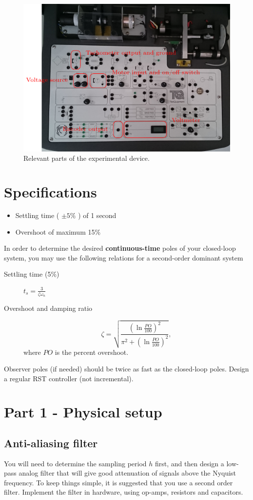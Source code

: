 \documentclass[a4paper]{scrartcl}
\begin{document}
\begin{figure}
\begin{center}
\includegraphics[width=0.7\linewidth]{figures/overview}
\caption{Relevant parts of the experimental device.}
\label{fig:equipment}
\end{center}
\end{figure}

\section*{Specifications}
\label{sec-2}

\begin{itemize}
\item Settling time ( \(\pm 5\%\) ) of 1 second
\item Overshoot of maximum 15\%
\end{itemize}

In order to determine the desired \textbf{continuous-time} poles of your closed-loop system, you may use the following relations for a second-order dominant system
\begin{description}
\item[{Settling time (5\%)}] \(t_s = \frac{3}{\zeta\omega_n}\)
\item[{Overshoot and damping ratio}] \[ \zeta = \sqrt{ \frac{(\ln \frac{PO}{100})^2}{\pi^2 + (\ln \frac{PO}{100})^2}}, \]
     where \(PO\) is the percent overshoot.
\end{description}

Observer poles (if needed) should be twice as fast as the closed-loop poles. Design a regular RST controller (not incremental).

\section*{Part 1 - Physical setup}
\label{sec-3}
\subsection*{Anti-aliasing filter}
\label{sec-3-1}
You will need to determine the sampling period \(h\) first, and then design a low-pass analog filter that will give good attenuation of signals above the Nyquist frequency. To keep things simple, it is suggested that you use a second order filter. Implement the filter in hardware, using op-amps, resistors and capacitors. 
\end{document}
